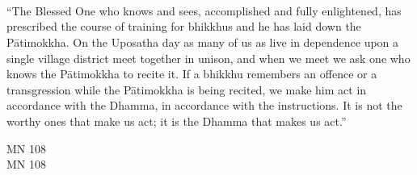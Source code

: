 
\cleartorecto
\thispagestyle{empty}

\ifafiveversion\vspace*{3em}\fi
\ifninebythirteenversion\vspace*{1.5em}\fi

{\centering


  \\[1.0\baselineskip] \fi
  \\[1.0\baselineskip] \fi

  \ifafiveversion {}
    {\Huge\chapterTitleFont\textsc{{\thesubtitle\linebreak}}}\\[0.2\baselineskip] \fi
  \ifninebythirteenversion {\fontsize{16}{12}\chapterTitleFont\textsc{{\thesubtitle\linebreak}}}\\[0.1\baselineskip] \fi

  \ifafiveversion {}\\[1.4\baselineskip] \fi
  \ifninebythirteenversion {}\\[1.25\baselineskip] \fi

  \\[2.0\baselineskip] \fi
  \\[1.8\baselineskip] \fi

  {\quote ``The Blessed One who knows and sees, accomplished and fully enlightened, has prescribed the course of training for bhikkhus and he has laid down the Pātimokkha. On the Uposatha day as many of us as live in dependence upon a single village district meet together in unison, and when we meet we ask one who knows the Pātimokkha to recite it. If a bhikkhu remembers an offence or a transgression while the Pātimokkha is being recited, we make him act in accordance with the Dhamma, in accordance with the instructions. It is not the worthy ones that make us act; it is the Dhamma that makes us act.''\\}

  \ifafiveversion \medskip MN 108\\[1.4\baselineskip]\fi
  \ifninebythirteenversion \smallskip \fontsize{8}{14}\selectfont MN 108\\[1.4\baselineskip]\fi

}

